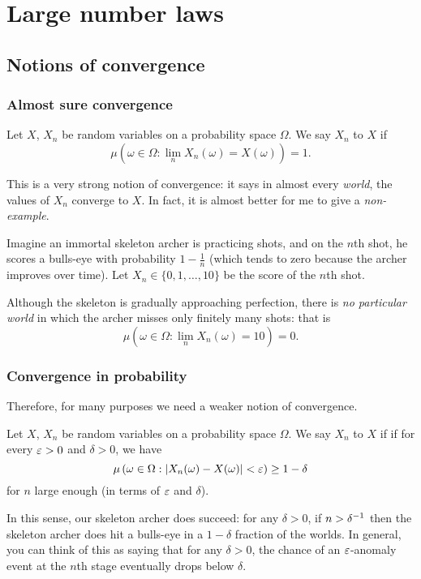 \chapter{Large number laws}
\section{Notions of convergence}
\subsection{Almost sure convergence}
\begin{definition}
	Let $X$, $X_n$ be random variables on a probability space $\Omega$.
	We say $X_n$  to $X$ if
	\[ \mu \left( \omega \in \Omega :
		\lim_n X_n(\omega) = X(\omega) \right) = 1. \]
\end{definition}
This is a very strong notion of convergence:
it says in almost every \emph{world},
the values of $X_n$ converge to $X$.
In fact, it is almost better for me to give a \emph{non-example}.
\begin{example}
	Imagine an immortal skeleton archer is practicing shots,
	and on the $n$th shot, he scores a bulls-eye with probability
	$1 - \frac 1n$
	(which tends to zero because the archer improves over time).
	Let $X_n \in \{0, 1, \dots, 10\}$ be the score of the $n$th shot.

	Although the skeleton is gradually approaching perfection,
	there is \emph{no particular world} in which the archer
	misses only finitely many shots: that is
	\[ \mu \left( \omega \in \Omega :
		\lim_n X_n(\omega) = 10 \right) = 0. \]
\end{example}

\subsection{Convergence in probability}
Therefore, for many purposes we need a weaker notion of convergence.
\begin{definition}
	Let $X$, $X_n$ be random variables on a probability space $\Omega$.
	We say $X_n$  to $X$ if
	if for every $\varepsilon > 0$ and $\delta > 0$, we have
	\[ \mu \left( \omega \in \Omega :
			\left\lvert X_n(\omega) - X(\omega) \right\rvert < \varepsilon
		\right) \ge 1 - \delta  \]
	for $n$ large enough (in terms of $\varepsilon$ and $\delta$).
\end{definition}
In this sense, our skeleton archer does succeed:
for any $\delta > 0$, if $n > \delta^{-1}$
then the skeleton archer does hit a bulls-eye
in a $1-\delta$ fraction of the worlds.
In general, you can think of this as saying that for any $\delta > 0$,
the chance of an $\varepsilon$-anomaly event at the $n$th stage
eventually drops below $\delta$.

